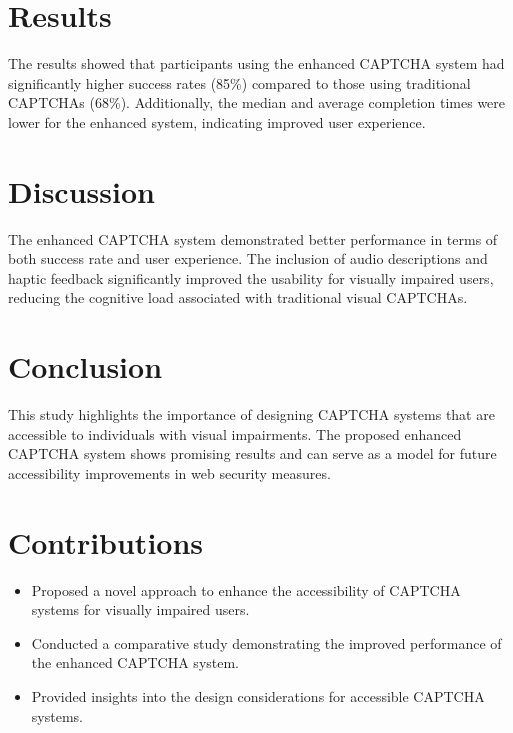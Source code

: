 \documentclass{article}
\begin{document}
\section{Results}
The results showed that participants using the enhanced CAPTCHA system had significantly higher success rates (85\%) compared to those using traditional CAPTCHAs (68\%). Additionally, the median and average completion times were lower for the enhanced system, indicating improved user experience.

\section{Discussion}
The enhanced CAPTCHA system demonstrated better performance in terms of both success rate and user experience. The inclusion of audio descriptions and haptic feedback significantly improved the usability for visually impaired users, reducing the cognitive load associated with traditional visual CAPTCHAs.

\section{Conclusion}
This study highlights the importance of designing CAPTCHA systems that are accessible to individuals with visual impairments. The proposed enhanced CAPTCHA system shows promising results and can serve as a model for future accessibility improvements in web security measures.

\section{Contributions}
\begin{itemize}
    \item Proposed a novel approach to enhance the accessibility of CAPTCHA systems for visually impaired users.
    \item Conducted a comparative study demonstrating the improved performance of the enhanced CAPTCHA system.
    \item Provided insights into the design considerations for accessible CAPTCHA systems.
\end{itemize}



\end{document}
